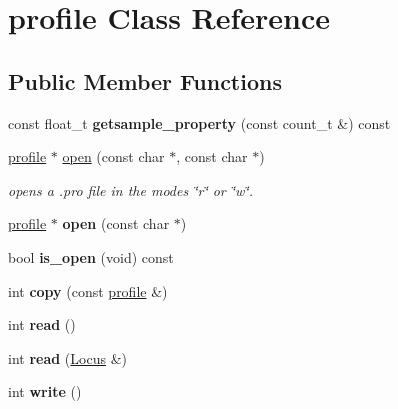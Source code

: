 \hypertarget{classprofile}{\section{profile Class Reference}
\label{classprofile}
}
\subsection*{Public Member Functions}
\begin{DoxyCompactItemize}
\item 
\hypertarget{classprofile_a139d96163dc596a2b3d472aca45c97c3}{const float\-\_\-t {\bfseries getsample\-\_\-property} (const count\-\_\-t \&) const }\label{classprofile_a139d96163dc596a2b3d472aca45c97c3}

\item 
\hyperlink{classprofile}{profile} $\ast$ \hyperlink{classprofile_a50ea49f3b293f621848fb2375cd1eaa6}{open} (const char $\ast$, const char $\ast$)
\begin{DoxyCompactList}\small\item\em opens a .pro file in the modes \char`\"{}r\char`\"{} or \char`\"{}w\char`\"{}. \end{DoxyCompactList}\item 
\hypertarget{classprofile_a2639e97ce5a52824c83e2071ba0fb7ee}{\hyperlink{classprofile}{profile} $\ast$ {\bfseries open} (const char $\ast$)}\label{classprofile_a2639e97ce5a52824c83e2071ba0fb7ee}

\item 
\hypertarget{classprofile_a5a6e4ce6f7cca8d0e0e9c40ad855eea7}{bool {\bfseries is\-\_\-open} (void) const }\label{classprofile_a5a6e4ce6f7cca8d0e0e9c40ad855eea7}

\item 
\hypertarget{classprofile_a36ce56a84e7800c1fbcaf75ad8d066f6}{int {\bfseries copy} (const \hyperlink{classprofile}{profile} \&)}\label{classprofile_a36ce56a84e7800c1fbcaf75ad8d066f6}

\item 
\hypertarget{classprofile_a252b01056cdfefe54c265a6e77f9c82b}{int {\bfseries read} ()}\label{classprofile_a252b01056cdfefe54c265a6e77f9c82b}

\item 
\hypertarget{classprofile_a0d15c93306b2072be45fbebc9a23c0ce}{int {\bfseries read} (\hyperlink{classLocus}{Locus} \&)}\label{classprofile_a0d15c93306b2072be45fbebc9a23c0ce}

\item 
\hypertarget{classprofile_a7dce10bed6159f785041a9b4b0099e47}{int {\bfseries write} ()}\label{classprofile_a7dce10bed6159f785041a9b4b0099e47}


\end{DoxyCompactItemize}
